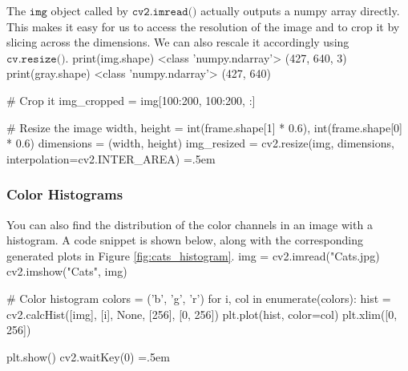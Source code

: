 \documentclass{article}
\newenvironment{cverbatim}
 {\SaveVerbatim{cverb}}
 {\endSaveVerbatim
  \flushleft\fboxrule=0pt\fboxsep=.5em
  \colorbox{cverbbg}{%
    \makebox[\dimexpr\linewidth-2\fboxsep][l]{\BUseVerbatim{cverb}}%
  }
  \endflushleft
}
\theoremstyle{definition}
\theoremstyle{remark}
\theoremstyle{definition}
\begin{document}
  The $\texttt{img}$ object called by $\texttt{cv2.imread()}$ actually outputs a numpy array directly. This makes it easy for us to access the resolution of the image and to crop it by slicing across the dimensions. We can also rescale it accordingly using $\texttt{cv.resize()}$. 
  \begin{cverbatim}
  print(img.shape)        <class 'numpy.ndarray'> (427, 640, 3)
  print(gray.shape)       <class 'numpy.ndarray'> (427, 640)

  # Crop it 
  img_cropped = img[100:200, 100:200, :]

  # Resize the image 
  width, height = int(frame.shape[1] * 0.6), int(frame.shape[0] * 0.6) 
  dimensions = (width, height) 
  img_resized = cv2.resize(img, dimensions, interpolation=cv2.INTER_AREA) 
  \end{cverbatim}

  \subsubsection{Color Histograms}

    You can also find the distribution of the color channels in an image with a histogram. A code snippet is shown below, along with the corresponding generated plots in Figure \ref{fig:cats_histogram}. 
    \begin{cverbatim}
    img = cv2.imread("Cats.jpg)
    cv2.imshow("Cats", img) 

    # Color histogram 
    colors = ('b', 'g', 'r') 
    for i, col in enumerate(colors): 
        hist = cv2.calcHist([img], [i], None, [256], [0, 256]) 
        plt.plot(hist, color=col) 
        plt.xlim([0, 256]) 
        
    plt.show() 
    cv2.waitKey(0) 
    \end{cverbatim}
\end{document}
